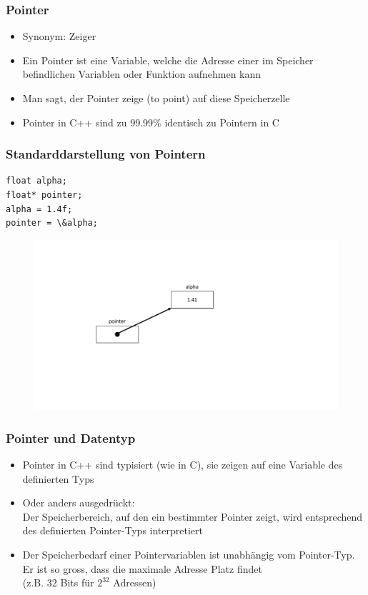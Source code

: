\subsubsection{Pointer}
\label{sec:subPointer}
\begin{itemize}
	\item Synonym: Zeiger
	\item Ein Pointer ist eine Variable, welche die Adresse einer im Speicher befindlichen Variablen oder Funktion aufnehmen kann
	\item Man sagt, der Pointer zeige (to point) auf diese Speicherzelle
	\item Pointer in C++ sind zu 99.99\% identisch zu Pointern in C
\end{itemize}

\subsubsection{Standarddarstellung von Pointern}
\label{sec:Standarddarstellung von Pointern}
\noindent
\begin{minipage}{\linewidth}
\begin{lstlisting}
float alpha;
float* pointer;
alpha = 1.4f;
pointer = \&alpha;
 \end{lstlisting}
\end{minipage}
\begin{figure}[h]
	\centering
	\includegraphics[width=0.4\linewidth]{images/pointer1.pdf}
\end{figure}

\subsubsection{Pointer und Datentyp}
\label{sec:Pointerund Datentyp}
\begin{itemize}
	\item Pointer in C++ sind typisiert (wie in C), sie zeigen auf eine Variable des definierten Typs
	\item Oder anders ausgedrückt:
		\\ Der Speicherbereich, auf den ein bestimmter Pointer zeigt, wird entsprechend des definierten Pointer-Typs interpretiert
	\item Der Speicherbedarf einer Pointervariablen ist unabhängig vom Pointer-Typ. Er ist so gross, dass die maximale Adresse Platz findet
		\\ (z.B. 32 Bits für $2^{32}$ Adressen)
\end{itemize}

